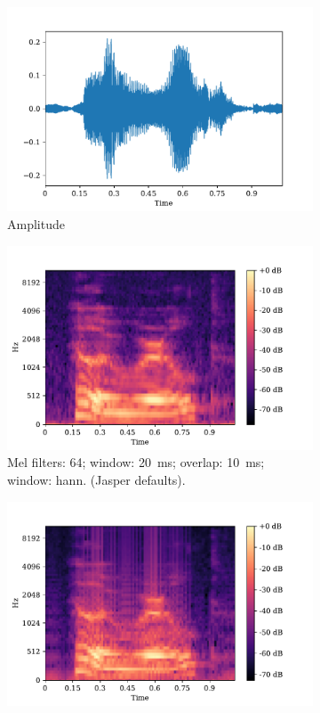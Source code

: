 \begin{figure}[h!b]
	\centering
	\begin{subfigure}[t]{.49\textwidth}
		\centering
		\includegraphics[width=.8\linewidth]{img/mel_amplitude}
		\caption{Amplitude}
		\label{fig:sfig1}
	\end{subfigure}%
	\hfill
	\begin{subfigure}[t]{.49\textwidth}
		\centering
		\includegraphics[width=.8\linewidth]{img/mel_jasper}
		\caption{Mel filters: 64; window: 20~ms; overlap: 10~ms; window: hann. (Jasper defaults).}
		\label{fig:sfig2}
	\end{subfigure}
	\begin{subfigure}[b]{.49\textwidth}
		\centering
		\includegraphics[width=.8\linewidth]{img/mel2}

\end{subfigure}
\end{figure}
